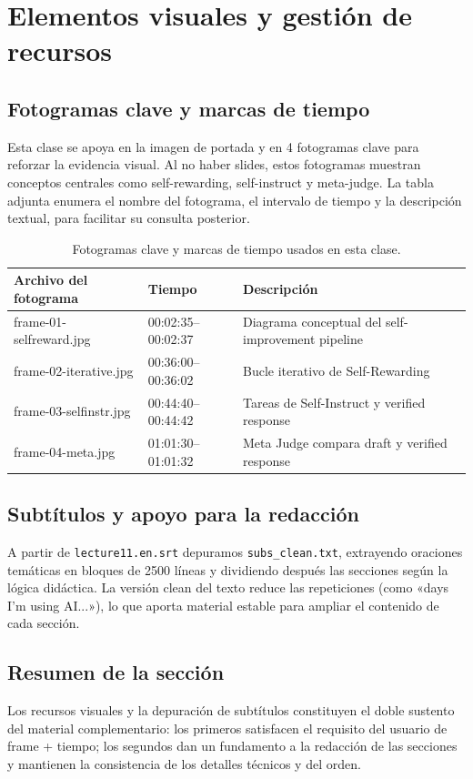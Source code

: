 \section{Elementos visuales y gestión de recursos}
\subsection{Fotogramas clave y marcas de tiempo}
Esta clase se apoya en la imagen de portada y en 4 fotogramas clave para reforzar la evidencia visual. Al no haber slides, estos fotogramas muestran conceptos centrales como self-rewarding, self-instruct y meta-judge. La tabla adjunta enumera el nombre del fotograma, el intervalo de tiempo y la descripción textual, para facilitar su consulta posterior.

\begin{table}[H]
\centering
\begin{tabular}{p{3cm}p{3cm}p{7cm}}
\toprule
Archivo del fotograma & Tiempo & Descripción \\
\midrule
frame-01-selfreward.jpg & 00:02:35--00:02:37 & Diagrama conceptual del self-improvement pipeline \\
frame-02-iterative.jpg & 00:36:00--00:36:02 & Bucle iterativo de Self-Rewarding \\
frame-03-selfinstr.jpg & 00:44:40--00:44:42 & Tareas de Self-Instruct y verified response \\
frame-04-meta.jpg & 01:01:30--01:01:32 & Meta Judge compara draft y verified response \\
\bottomrule
\end{tabular}
\caption{Fotogramas clave y marcas de tiempo usados en esta clase.}
\end{table}

\subsection{Subtítulos y apoyo para la redacción}
A partir de \texttt{lecture11.en.srt} depuramos \texttt{subs\_clean.txt}, extrayendo oraciones temáticas en bloques de 2500 líneas y dividiendo después las secciones según la lógica didáctica. La versión clean del texto reduce las repeticiones (como «days I'm using AI...»), lo que aporta material estable para ampliar el contenido de cada sección.

\subsection{Resumen de la sección}
Los recursos visuales y la depuración de subtítulos constituyen el doble sustento del material complementario: los primeros satisfacen el requisito del usuario de frame + tiempo; los segundos dan un fundamento a la redacción de las secciones y mantienen la consistencia de los detalles técnicos y del orden.

